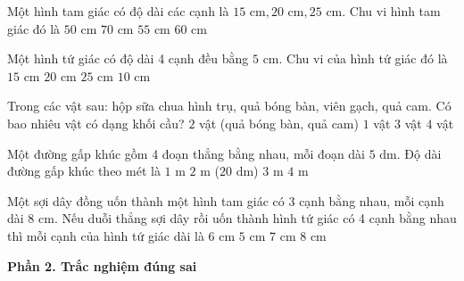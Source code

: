 \begin{ex} %
Một hình tam giác có độ dài các cạnh là $15\text{ cm}, 20\text{ cm}, 25\text{ cm}$. Chu vi hình tam giác đó là
\choice
{$50\text{ cm}$}
{$70\text{ cm}$}
{$55\text{ cm}$}
{\True $60\text{ cm}$}
\end{ex}

\begin{ex} %
Một hình tứ giác có độ dài 4 cạnh đều bằng $5\text{ cm}$. Chu vi của hình tứ giác đó là
\choice
{$15\text{ cm}$}
{\True $20\text{ cm}$}
{$25\text{ cm}$}
{$10\text{ cm}$}
\end{ex}

\begin{ex} %
Trong các vật sau: hộp sữa chua hình trụ, quả bóng bàn, viên gạch, quả cam. Có bao nhiêu vật có dạng khối cầu?
\choice
{\True $2$ vật (quả bóng bàn, quả cam)}
{$1$ vật}
{$3$ vật}
{$4$ vật}
\end{ex}

\begin{ex} %
Một đường gấp khúc gồm 4 đoạn thẳng bằng nhau, mỗi đoạn dài $5\text{ dm}$. Độ dài đường gấp khúc theo mét là
\choice
{$1\text{ m}$}
{\True $2\text{ m}$ ($20\text{ dm}$)}
{$3\text{ m}$}
{$4\text{ m}$}
\end{ex}

\begin{ex} %
Một sợi dây đồng uốn thành một hình tam giác có 3 cạnh bằng nhau, mỗi cạnh dài $8\text{ cm}$. Nếu duỗi thẳng sợi dây rồi uốn thành hình tứ giác có 4 cạnh bằng nhau thì mỗi cạnh của hình tứ giác dài là
\choice
{\True $6\text{ cm}$}
{$5\text{ cm}$}
{$7\text{ cm}$}
{$8\text{ cm}$}
\end{ex}

\textbf{Phần 2. Trắc nghiệm đúng sai}

